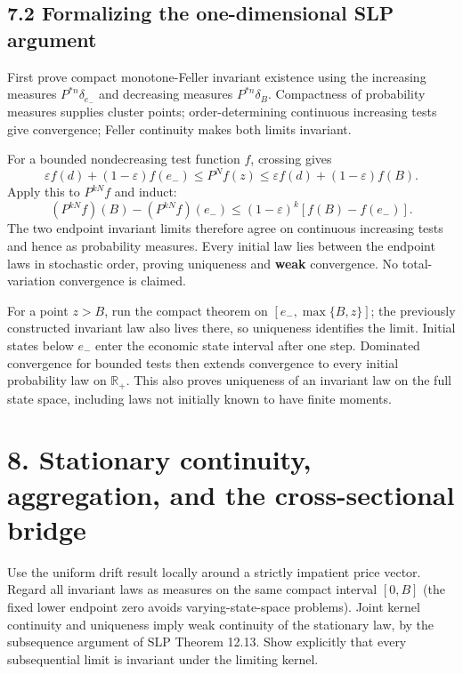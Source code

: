 \documentclass[
  11pt,
]{article}
\begin{document}
\subsection{7.2 Formalizing the one-dimensional SLP
argument}\label{formalizing-the-one-dimensional-slp-argument}

First prove compact monotone-Feller invariant existence using the
increasing measures \(P^{*n}\delta_{e_-}\) and decreasing measures
\(P^{*n}\delta_B\). Compactness of probability measures supplies cluster
points; order-determining continuous increasing tests give convergence;
Feller continuity makes both limits invariant.

For a bounded nondecreasing test function \(f\), crossing gives \[
\varepsilon f(d)+(1-\varepsilon)f(e_-)
\leq P^Nf(z)
\leq\varepsilon f(d)+(1-\varepsilon)f(B).
\] Apply this to \(P^{kN}f\) and induct: \[
(P^{kN}f)(B)-(P^{kN}f)(e_-)
\leq(1-\varepsilon)^k[f(B)-f(e_-)].
\] The two endpoint invariant limits therefore agree on continuous
increasing tests and hence as probability measures. Every initial law
lies between the endpoint laws in stochastic order, proving uniqueness
and \textbf{weak} convergence. No total-variation convergence is
claimed.

For a point \(z>B\), run the compact theorem on \([e_-,\max\{B,z\}]\);
the previously constructed invariant law also lives there, so uniqueness
identifies the limit. Initial states below \(e_-\) enter the economic
state interval after one step. Dominated convergence for bounded tests
then extends convergence to every initial probability law on
\(\mathbb R_+\). This also proves uniqueness of an invariant law on the
full state space, including laws not initially known to have finite
moments.

\section{8. Stationary continuity, aggregation, and the cross-sectional
bridge}\label{stationary-continuity-aggregation-and-the-cross-sectional-bridge}

Use the uniform drift result locally around a strictly impatient price
vector. Regard all invariant laws as measures on the same compact
interval \([0,B]\) (the fixed lower endpoint zero avoids
varying-state-space problems). Joint kernel continuity and uniqueness
imply weak continuity of the stationary law, by the subsequence argument
of SLP Theorem 12.13. Show explicitly that every subsequential limit is
invariant under the limiting kernel.
\end{document}

